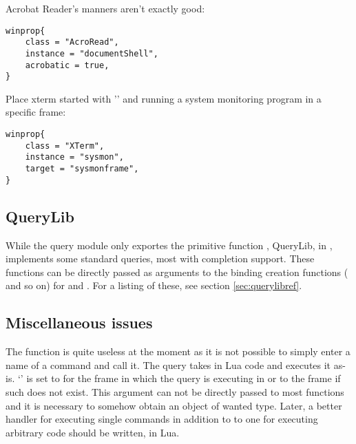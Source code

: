 Acrobat Reader's manners aren't exactly good:
\begin{verbatim}
winprop{
    class = "AcroRead",
    instance = "documentShell",
    acrobatic = true,
}
\end{verbatim}

Place xterm started with '' and running a system
monitoring program in a specific frame:
\begin{verbatim}
winprop{
    class = "XTerm",
    instance = "sysmon",
    target = "sysmonframe",
}
\end{verbatim}


\subsection{QueryLib}

While the query module only exportes the primitive function
, QueryLib, in , implements some
standard queries, most with completion support. These functions can be
directly passed as arguments to the binding creation functions
( and so on) for  and
. For a listing of these, see section
\ref{sec:querylibref}.

\subsection{Miscellaneous issues}

The  function is quite useless at the moment as it
is not possible to simply enter a name of a command and call it.
The query takes in Lua code and executes it as-is. `' is set
to  for the frame
in which the query is executing in or to the frame if such does not exist.
This argument can not be directly passed to most functions and it is
necessary to somehow obtain an object of wanted type. Later, a better
handler for executing single commands in addition to to one for executing
arbitrary code should be written, in Lua.


